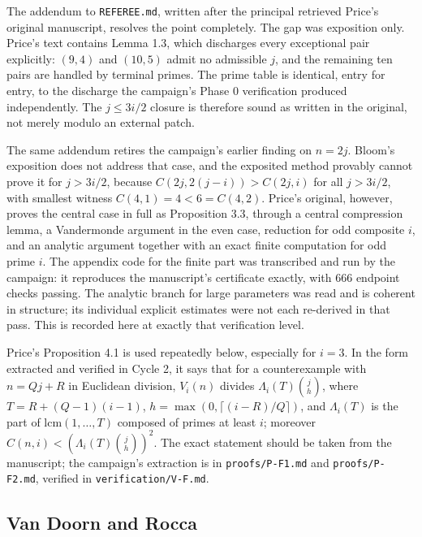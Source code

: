 \documentclass[11pt]{article}
\theoremstyle{remark}
\begin{document}
The addendum to \texttt{REFEREE.md}, written after the principal retrieved Price's original manuscript, resolves the point completely. The gap was exposition only. Price's text contains Lemma 1.3, which discharges every exceptional pair explicitly: $(9,4)$ and $(10,5)$ admit no admissible $j$, and the remaining ten pairs are handled by terminal primes. The prime table is identical, entry for entry, to the discharge the campaign's Phase 0 verification produced independently. The $j\le 3i/2$ closure is therefore sound as written in the original, not merely modulo an external patch.

The same addendum retires the campaign's earlier finding on $n=2j$. Bloom's exposition does not address that case, and the exposited method provably cannot prove it for $j>3i/2$, because $C(2j,2(j-i))>C(2j,i)$ for all $j>3i/2$, with smallest witness $C(4,1)=4<6=C(4,2)$. Price's original, however, proves the central case in full as Proposition 3.3, through a central compression lemma, a Vandermonde argument in the even case, reduction for odd composite $i$, and an analytic argument together with an exact finite computation for odd prime $i$. The appendix code for the finite part was transcribed and run by the campaign: it reproduces the manuscript's certificate exactly, with $666$ endpoint checks passing. The analytic branch for large parameters was read and is coherent in structure; its individual explicit estimates were not each re-derived in that pass. This is recorded here at exactly that verification level.

Price's Proposition 4.1 is used repeatedly below, especially for $i=3$. In the form extracted and verified in Cycle 2, it says that for a counterexample with $n=Qj+R$ in Euclidean division, $V_i(n)$ divides $\Lambda_i(T)\binom{j}{h}$, where $T=R+(Q-1)(i-1)$, $h=\max(0,\lceil (i-R)/Q\rceil)$, and $\Lambda_i(T)$ is the part of $\mathrm{lcm}(1,\dots,T)$ composed of primes at least $i$; moreover $C(n,i)<(\Lambda_i(T)\binom{j}{h})^2$. The exact statement should be taken from the manuscript; the campaign's extraction is in \texttt{proofs/P-F1.md} and \texttt{proofs/P-F2.md}, verified in \texttt{verification/V-F.md}.

\subsection{Van Doorn and Rocca}
\end{document}
